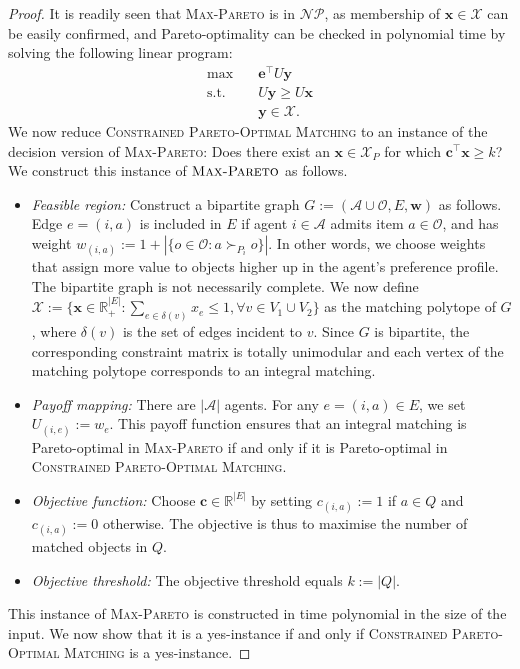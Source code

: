 \documentclass[a4paper, 11pt]{article}
\newcommand{\mbb}{\mathbb}
\newcommand{\mc}{\mathcal}
\begin{document}
\begin{proof}
It is readily seen that \textsc{Max-Pareto} is in $\mc{NP}$, as membership of $\bm{x} \in \mathcal{X}$ can be easily confirmed, and Pareto-optimality can be checked in polynomial time by solving the following linear program:
\begin{subequations}
\begin{align}
\max \quad & \bm{e}^\top U \bm{y} \\
\text{s.t.} \quad & U \bm{y} \geq U \bm{x} \\ 
& \bm{y} \in \mc{X}.  
\end{align}
\end{subequations}
We now reduce \textsc{Constrained Pareto-Optimal Matching} to an instance of the decision version of \textsc{Max-Pareto}: Does there exist an $\bm{x} \in \mc{X}_{P}$ for which $\bm{c}^\top \bm{x} \geq k$? We construct this instance of $\textsc{Max-Pareto}$ as follows.
\begin{itemize}
    \item \textit{Feasible region:} Construct a bipartite graph $G := (\mc{A} \cup \mc{O}, E, \bm{w})$ as follows. Edge $e = (i, a)$ is included in $E$ if agent $i \in \mc{A}$ admits item $a \in \mc{O}$, and has weight $w_{(i, a)} := 1 + | \{ o \in \mc{O} : a \succ_{P_i} o\} |$. In other words, we choose weights that assign more value to objects higher up in the agent's preference profile. The bipartite graph is not necessarily complete. We now define $\mc{X} := \{ \bm{x} \in \mathbb{R}^{|E|}_{+} : \sum\limits_{e \in \delta(v)} x_e \leq 1, \forall v \in V_1 \cup V_2\}$ as the matching polytope of $G$, where $\delta(v)$ is the set of edges incident to $v$. Since $G$ is bipartite, the corresponding constraint matrix is totally unimodular and each vertex of the matching polytope corresponds to an integral matching.
    \item \textit{Payoff mapping:} There are $|\mc{A}|$ agents. For any $e = (i, a) \in E$, we set $U_{(i, e)} := w_e$. This payoff function ensures that an integral matching is Pareto-optimal in \textsc{Max-Pareto} if and only if it is Pareto-optimal in \textsc{Constrained Pareto-Optimal Matching}.
    \item \textit{Objective function:} Choose $\bm{c} \in \mbb{R}^{|E|}$ by setting $c_{(i, a)} := 1$ if $a \in Q$ and $c_{(i, a)} := 0$ otherwise. The objective is thus to maximise the number of matched objects in $Q$.
    \item \textit{Objective threshold:} The objective threshold equals $k := |Q|$.
\end{itemize} 
This instance of \textsc{Max-Pareto} is constructed in time polynomial in the size of the input. We now show that it is a yes-instance if and only if \textsc{Constrained Pareto-Optimal Matching} is a yes-instance.


\end{proof}
\end{document}
